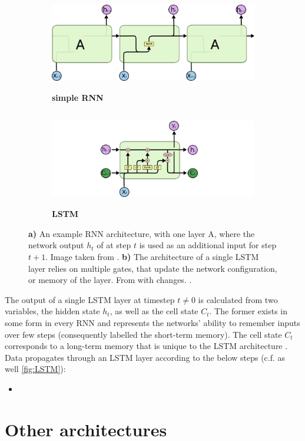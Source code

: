 \begin{figure}
	\centering
	\begin{subfigure}[h]{0.45\linewidth}
	\includegraphics[height=4.2cm]{imgs/simple_RNN.png}
	\caption{\textbf{simple RNN}\label{fig:simple-RNN}}
	\end{subfigure}
	\hfill
	\begin{subfigure}[h]{0.45\linewidth}
	\includegraphics[height=4.2cm]{imgs/LSTM.png}
	\caption{\textbf{LSTM}\label{fig:LSTM}}
	\end{subfigure}
	\caption*{\textbf{a)} An example RNN architecture, with one layer A, where the network output $h_t$ of at step $t$ is used as an additional input for step $t+1$. 
	Image taken from \cite{NN-images}. \textbf{b)} The architecture of a single LSTM layer relies on multiple gates, that update the network
	configuration, or memory of the layer. From \cite{NN-images} with changes. \label{fig:NN-architectures}.}
\end{figure}

The output of a single LSTM layer at timestep $t\neq0$ is calculated from two variables, the hidden state $h_t$, as well as the cell state $C_t$. The former exists in 
some form in every RNN and represents the networks' ability to remember inputs over few steps (consequently labelled the short-term memory). The cell state $C_t$
corresponds to a long-term memory that is unique to the LSTM architecture \cite{gers2000learning}. Data propagates through an LSTM layer according to the below steps
(c.f. as well \autoref{fig:LSTM}):

\begin{itemize}
	\item 

\end{itemize}

\section{Other architectures}
\label{sec:NN-other}
